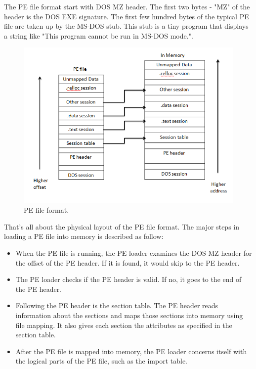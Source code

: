 The PE file format start with DOS MZ header. The first two bytes - "MZ" of the header is the DOS EXE signature. The first few hundred bytes of the typical PE file are taken up by the MS-DOS stub. This stub is a tiny program that displays a string like "This program cannot be run in MS-DOS mode.". 

\begin{figure}[h!]
\centering
\includegraphics[width=1\textwidth]{graph/pe1.png}
\caption{PE file format.}
\label{fig:pe1}
\end{figure}

That's all about the physical layout of the PE file format. The major steps in loading a PE file into memory is described as follow:

\begin{itemize}
\item When the PE file is running, the PE loader examines the DOS MZ header for the offset of the PE header. If it is found, it would skip to the PE header.
\item The PE loader checks if the PE header is valid. If no, it goes to the end of the PE header.
\item Following the PE header is the section table. The PE header reads information about the sections and maps those sections into memory using file mapping. It also gives each section the attributes as specified in the section table.
\item After the PE file is mapped into memory, the PE loader concerns itself with the logical parts of the PE file, such as the import table.
\end{itemize}


